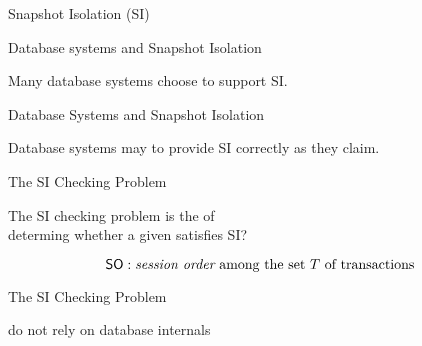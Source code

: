 \begin{frame}{Snapshot Isolation (SI)}
  \begin{center}
    \resizebox{0.60\textwidth}{!}{}
  \end{center}
\end{frame}

\begin{frame}{Database systems and Snapshot Isolation}
  \begin{center}
    Many database systems choose to support SI.
  \end{center}
\end{frame}

\begin{frame}{Database Systems and Snapshot Isolation}
  \begin{center}
    Database systems may  to provide SI correctly as they claim.

    \vspace{0.30cm}
  \end{center}
\end{frame}

\begin{frame}{The SI Checking Problem}
  \begin{definition}
    The SI checking problem is the  of \\[5pt]
    determing whether a given  satisfies SI?
  \end{definition}


  \pause
  \vspace{-0.50cm}
  \[
    \textup{\textsf{SO}}: \text{{\it session order} among the set $T$ of transactions}
  \]
\end{frame}

\begin{frame}{The SI Checking Problem}
  \begin{center}
     do not rely on database internals

    \vspace{0.20cm}
    \resizebox{0.55\textwidth}{!}{}
    \vspace{0.20cm}

  \end{center}
\end{frame}

